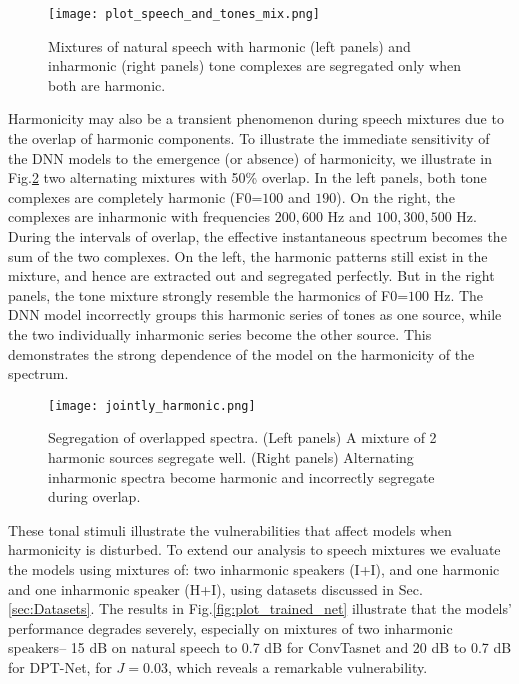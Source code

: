 \documentclass{article}
\begin{document}
\begin{figure}[!htbp]
  \centering
  \texttt{[image: plot\_speech\_and\_tones\_mix.png]}
  \caption{Mixtures of natural speech with harmonic (left panels) and inharmonic (right panels) tone complexes are segregated only when both are harmonic.}
  \label{fig:plot_speech_and_tones_mix}
\end{figure}
\vspace*{-2mm}
Harmonicity may also be a transient phenomenon during speech mixtures due to the overlap of harmonic components. To illustrate the immediate sensitivity of the DNN models to the emergence (or absence) of harmonicity, we illustrate in Fig.\ref{fig:overlap_harmonics} two alternating mixtures with  50\% overlap. In the left panels, both tone complexes are completely harmonic (F0=$100$ and $190$). On the right, the  complexes are inharmonic with frequencies  $200, 600$ Hz and $100, 300, 500$ Hz. During the intervals of overlap, the effective instantaneous spectrum becomes the sum of the two complexes. On the left, the harmonic patterns still exist in the mixture, and hence are extracted out and segregated perfectly. But in the right panels, the tone mixture strongly resemble the harmonics of F0=$100$ Hz. The DNN model incorrectly groups this harmonic series of tones as one source, while the two individually inharmonic series become the other source. This demonstrates the strong dependence of the model on the harmonicity of the spectrum.\\
\begin{figure}[htp]
  \centering
  \texttt{[image: jointly\_harmonic.png]}
  \caption{Segregation of overlapped spectra. (Left panels) A mixture of 2 harmonic sources segregate well. (Right panels) Alternating inharmonic spectra  become harmonic and incorrectly segregate during overlap.}
  \vspace*{-3mm}
  \label{fig:overlap_harmonics}
\end{figure}
These tonal stimuli illustrate the vulnerabilities that affect  models when harmonicity is disturbed. To extend our analysis to speech mixtures we evaluate the models using mixtures of: two inharmonic speakers (I+I), and one harmonic and one inharmonic speaker (H+I), using datasets discussed in Sec. \ref{sec:Datasets}. The results in Fig.\ref{fig:plot_trained_net} illustrate that the models' performance degrades severely, especially on mixtures of two inharmonic speakers-- 15 dB on natural speech to 0.7 dB for ConvTasnet and 20 dB to 0.7 dB for DPT-Net, for $J=0.03$, which reveals a remarkable vulnerability.
\end{document}
